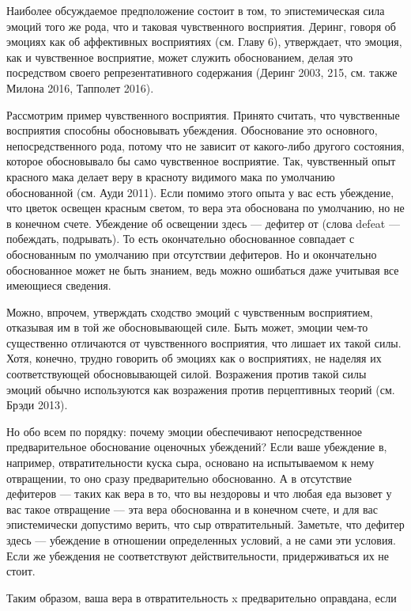 \documentclass[11pt]{book}
\begin{document}
Наиболее обсуждаемое предположение состоит в том, то эпистемическая сила эмоций того же рода, что и таковая чувственного восприятия. Деринг, говоря об эмоциях как об аффективных восприятиях (см. Главу 6), утверждает, что эмоция, как и чувственное восприятие, может служить обоснованием, делая это посредством своего репрезентативного содержания (Деринг 2003, 215, см. также Милона 2016, Тапполет 2016).

Рассмотрим пример чувственного восприятия. Принято считать, что чувственные восприятия способны обосновывать убеждения. Обоснование это основного, непосредственного рода, потому что не зависит от какого-либо другого состояния, которое обосновывало бы само чувственное восприятие. Так, чувственный опыт красного мака делает веру в красноту видимого мака по умолчанию обоснованной (см. Ауди 2011). Если помимо этого опыта у вас есть убеждение, что цветок освещен красным светом, то вера эта обоснована по умолчанию, но не в конечном счете. Убеждение об освещении здесь --- дефитер от (слова defeat --- побеждать, подрывать). То есть окончательно обоснованное совпадает с обоснованным по умолчанию при отсутствии дефитеров. Но и окончательно обоснованное может не быть знанием, ведь можно ошибаться даже учитывая все имеющиеся сведения.

Можно, впрочем, утверждать сходство эмоций с чувственным восприятием, отказывая им в той же обосновывающей силе. Быть может, эмоции чем-то существенно отличаются от чувственного восприятия, что лишает их такой силы. Хотя, конечно, трудно говорить об эмоциях как о восприятиях, не наделяя их соответствующей обосновывающей силой. Возражения против такой силы эмоций обычно используются как возражения против перцептивных теорий (см. Брэди 2013).

Но обо всем по порядку: почему эмоции обеспечивают непосредственное предварительное обоснование оценочных убеждений? Если ваше убеждение в, например, отвратительности куска сыра, основано на испытываемом к нему отвращении, то оно сразу предварительно обоснованно. А в отсутствие дефитеров --- таких как вера в то, что вы нездоровы и что любая еда вызовет у вас такое отвращение --- эта вера обоснованна и в конечном счете, и для вас эпистемически допустимо верить, что сыр отвратительный. Заметьте, что дефитер здесь --- убеждение в отношении определенных условий, а не сами эти условия. Если же убеждения не соответствуют действительности, придерживаться их не стоит.

Таким образом, ваша вера в отвратительность x предварительно оправдана, если
\end{document}
